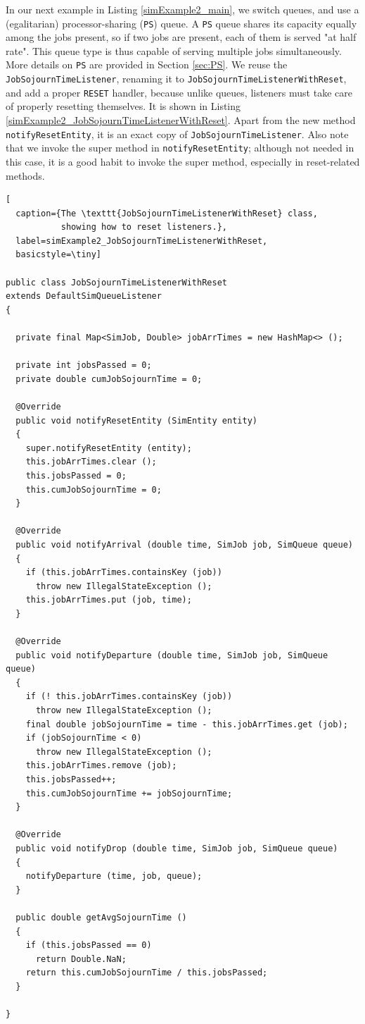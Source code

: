 \documentclass[12pt]{book}
\begin{document}
In our next example in Listing \ref{simExample2_main},
  we switch queues, and use a (egalitarian)
  processor-sharing (\lstinline|PS|) queue.
A \lstinline|PS| queue shares its capacity equally among the jobs present,
  so if two jobs are present, each of them is served
  "at half rate".
This queue type is thus capable of serving multiple jobs simultaneously.
More details on \lstinline|PS|
  are provided in Section \ref{sec:PS}.
We reuse the \lstinline|JobSojournTimeListener|,
  renaming it to \lstinline|JobSojournTimeListenerWithReset|,
  and add a proper \lstinline|RESET| handler,
  because unlike queues,
  listeners must take care of properly resetting themselves.
It is shown in Listing \ref{simExample2_JobSojournTimeListenerWithReset}.
Apart from the new method \lstinline|notifyResetEntity|,
  it is an exact copy of \lstinline|JobSojournTimeListener|.
Also note that we invoke the super method in \lstinline|notifyResetEntity|;
  although not needed in this case, it is a good habit
  to invoke the super method, especially in reset-related methods.

\begin{lstfloat}
\begin{lstlisting}[
  caption={The \texttt{JobSojournTimeListenerWithReset} class,
           showing how to reset listeners.},
  label=simExample2_JobSojournTimeListenerWithReset,
  basicstyle=\tiny]

public class JobSojournTimeListenerWithReset
extends DefaultSimQueueListener
{

  private final Map<SimJob, Double> jobArrTimes = new HashMap<> ();

  private int jobsPassed = 0;
  private double cumJobSojournTime = 0;

  @Override
  public void notifyResetEntity (SimEntity entity)
  {
    super.notifyResetEntity (entity);
    this.jobArrTimes.clear ();
    this.jobsPassed = 0;
    this.cumJobSojournTime = 0;
  }
    
  @Override
  public void notifyArrival (double time, SimJob job, SimQueue queue)
  {
    if (this.jobArrTimes.containsKey (job))
      throw new IllegalStateException ();
    this.jobArrTimes.put (job, time);
  }
  
  @Override
  public void notifyDeparture (double time, SimJob job, SimQueue queue)
  {
    if (! this.jobArrTimes.containsKey (job))
      throw new IllegalStateException ();
    final double jobSojournTime = time - this.jobArrTimes.get (job);
    if (jobSojournTime < 0)
      throw new IllegalStateException ();
    this.jobArrTimes.remove (job);
    this.jobsPassed++;
    this.cumJobSojournTime += jobSojournTime;
  }

  @Override
  public void notifyDrop (double time, SimJob job, SimQueue queue)
  {
    notifyDeparture (time, job, queue);
  }
  
  public double getAvgSojournTime ()
  {
    if (this.jobsPassed == 0)
      return Double.NaN;
    return this.cumJobSojournTime / this.jobsPassed;
  }
  
}

\end{lstlisting}
\end{lstfloat}
\end{document}
